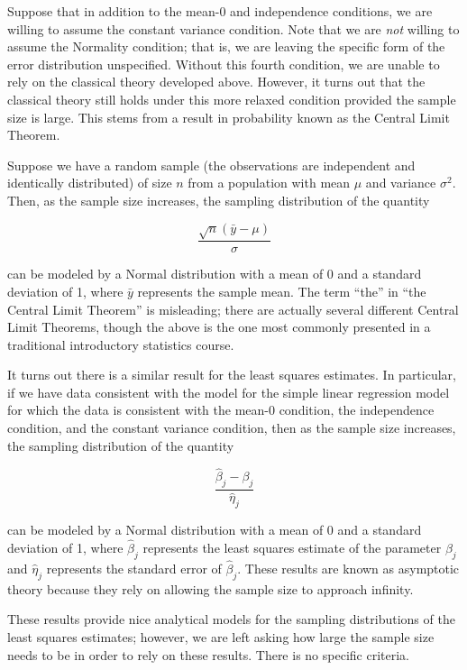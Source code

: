 \documentclass[
  letterpaper,
  DIV=11,
  numbers=noendperiod]{scrreprt}
\theoremstyle{plain}
\theoremstyle{definition}
\theoremstyle{definition}
\theoremstyle{remark}
\begin{document}
Suppose that in addition to the mean-0 and independence conditions, we
are willing to assume the constant variance condition. Note that we are
\emph{not} willing to assume the Normality condition; that is, we are
leaving the specific form of the error distribution unspecified. Without
this fourth condition, we are unable to rely on the classical theory
developed above. However, it turns out that the classical theory still
holds under this more relaxed condition provided the sample size is
large. This stems from a result in probability known as the Central
Limit Theorem.

Suppose we have a random sample (the observations are independent and
identically distributed) of size \(n\) from a population with mean
\(\mu\) and variance \(\sigma^2\). Then, as the sample size increases,
the sampling distribution of the quantity

\[\frac{\sqrt{n} \left(\bar{y} - \mu\right)}{\sigma}\]

can be modeled by a Normal distribution with a mean of 0 and a standard
deviation of 1, where \(\bar{y}\) represents the sample mean. The term
``the'' in ``the Central Limit Theorem'' is misleading; there are
actually several different Central Limit Theorems, though the above is
the one most commonly presented in a traditional introductory statistics
course.

It turns out there is a similar result for the least squares estimates.
In particular, if we have data consistent with the model for the simple
linear regression model for which the data is consistent with the mean-0
condition, the independence condition, and the constant variance
condition, then as the sample size increases, the sampling distribution
of the quantity

\[\frac{\widehat{\beta}_j - \beta_j}{\widehat{\eta}_j}\]

can be modeled by a Normal distribution with a mean of 0 and a standard
deviation of 1, where \(\widehat{\beta}_j\) represents the least squares
estimate of the parameter \(\beta_j\) and \(\widehat{\eta}_j\)
represents the standard error of \(\widehat{\beta}_j\). These results
are known as asymptotic theory because they rely on allowing the sample
size to approach infinity.

These results provide nice analytical models for the sampling
distributions of the least squares estimates; however, we are left
asking how large the sample size needs to be in order to rely on these
results. There is no specific criteria.
\end{document}
